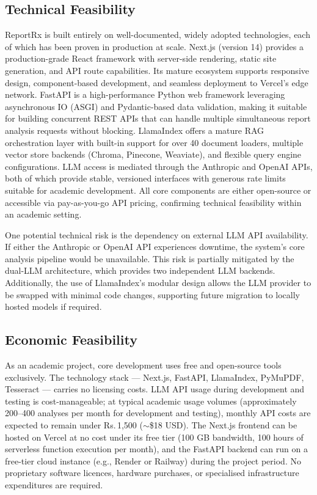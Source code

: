 \subsection{Technical Feasibility}
ReportRx is built entirely on well-documented, widely adopted technologies, each of which has been proven in production at scale. Next.js (version 14) provides a production-grade React framework with server-side rendering, static site generation, and API route capabilities. Its mature ecosystem supports responsive design, component-based development, and seamless deployment to Vercel's edge network. FastAPI is a high-performance Python web framework leveraging asynchronous IO (ASGI) and Pydantic-based data validation, making it suitable for building concurrent REST APIs that can handle multiple simultaneous report analysis requests without blocking. LlamaIndex offers a mature RAG orchestration layer with built-in support for over 40 document loaders, multiple vector store backends (Chroma, Pinecone, Weaviate), and flexible query engine configurations. LLM access is mediated through the Anthropic and OpenAI APIs, both of which provide stable, versioned interfaces with generous rate limits suitable for academic development. All core components are either open-source or accessible via pay-as-you-go API pricing, confirming technical feasibility within an academic setting.

One potential technical risk is the dependency on external LLM API availability. If either the Anthropic or OpenAI API experiences downtime, the system's core analysis pipeline would be unavailable. This risk is partially mitigated by the dual-LLM architecture, which provides two independent LLM backends. Additionally, the use of LlamaIndex's modular design allows the LLM provider to be swapped with minimal code changes, supporting future migration to locally hosted models if required.

\subsection{Economic Feasibility}
As an academic project, core development uses free and open-source tools exclusively. The technology stack --- Next.js, FastAPI, LlamaIndex, PyMuPDF, Tesseract --- carries no licensing costs. LLM API usage during development and testing is cost-manageable; at typical academic usage volumes (approximately 200--400 analyses per month for development and testing), monthly API costs are expected to remain under Rs.\,1,500 ($\sim$\$18 USD). The Next.js frontend can be hosted on Vercel at no cost under its free tier (100 GB bandwidth, 100 hours of serverless function execution per month), and the FastAPI backend can run on a free-tier cloud instance (e.g., Render or Railway) during the project period. No proprietary software licences, hardware purchases, or specialised infrastructure expenditures are required.

